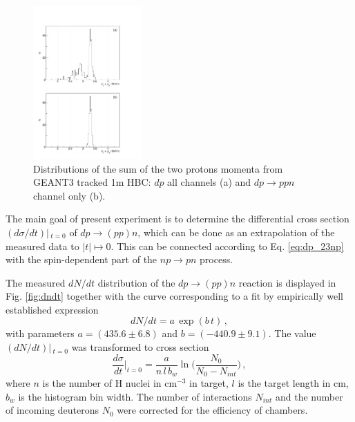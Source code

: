 \documentclass[twocolumn,epjc3]{svjour3}
\newcommand{\np}     {\ensuremath{np \rightarrow pn}\xspace}
\newcommand{\dpfrag} {\ensuremath{dp \rightarrow ppn}\xspace}
\newcommand{\dpchex} {\ensuremath{dp \rightarrow (pp)n}\xspace}
\begin{document}
\begin{figure}[b]
  \centering
  \includegraphics[width=0.37\textwidth]{p1_plus_p2_2.pdf}    %
  \caption{Distributions of the sum of the two protons momenta from GEANT3
    tracked 1m HBC: $dp$ all channels (a) and \dpfrag channel only (b).}
  \label{fig:p1p2sim}
\end{figure}


The main goal of present experiment is to determine the differential cross
section $(d\sigma/dt)|\,_{t=0}$ of \dpchex, which can be done as an
extrapolation of the measured data to $|t|\mapsto0$. This can be connected
according to Eq. \eqref{eq:dp_23np} with the spin-dependent part of the \np
process.

The measured $dN/dt$ distribution of the \dpchex reaction is displayed in
Fig. \ref{fig:dndt} together with the curve corresponding to a fit by
empirically well established expression
\begin{equation}
  \label{eq:dndtfit}
  dN/dt = a\,\exp(b\,t)\,,
\end{equation}
with parameters $a=(435.6 \pm 6.8)$ and $b=(-440.9 \pm 9.1)$.
The value $(dN/dt)|\,_{t=0}$ was transformed to cross section
\begin{equation}
  \frac{d\sigma}{dt}\Big|_{t=0} =
  \frac{a}{n\,l\,b_w}\ln\bigg(\frac{N_0}{N_0-N_{int}}\bigg)\,,
\end{equation}
where $n$ is the number of H nuclei in cm$^{-3}$ in target, $l$ is the target
length in cm, $b_w$ is the histogram bin width. The number of interactions
$N_{int}$ and the number of incoming deuterons $N_0$ were corrected for the
efficiency of chambers.
\end{document}

